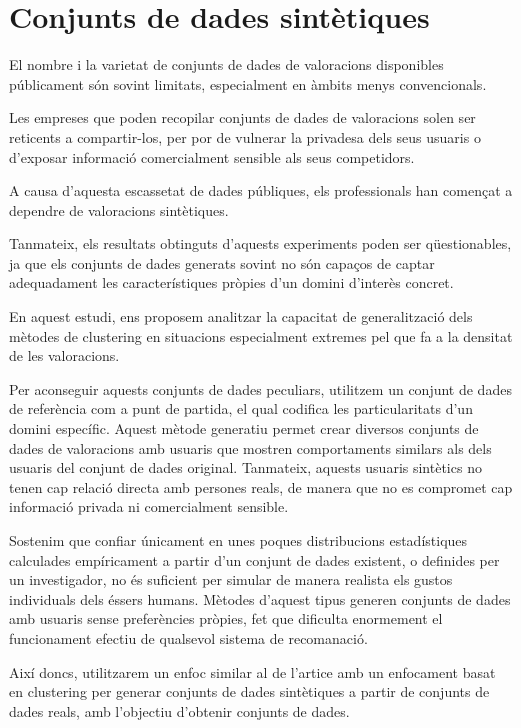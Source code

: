 \documentclass[a4paper,12pt]{report}
\begin{document}
\section{Conjunts de dades sintètiques}

El nombre i la varietat de conjunts de dades de valoracions disponibles públicament són sovint limitats, especialment en àmbits menys convencionals.

Les empreses que poden recopilar conjunts de dades de valoracions solen ser reticents a compartir-los, per por de vulnerar la privadesa dels seus usuaris o d’exposar informació comercialment sensible als seus competidors.

A causa d’aquesta escassetat de dades públiques, els professionals han començat a dependre de valoracions sintètiques.

Tanmateix, els resultats obtinguts d’aquests experiments poden ser qüestionables, ja que els conjunts de dades generats sovint no són capaços de captar adequadament les característiques pròpies d’un domini d’interès concret.

En aquest estudi, ens proposem analitzar la capacitat de generalització dels mètodes de clustering en situacions especialment extremes pel que fa a la densitat de les valoracions.

Per aconseguir aquests conjunts de dades peculiars, utilitzem un conjunt de dades de referència com a punt de partida, el qual codifica les particularitats d’un domini específic. Aquest mètode generatiu permet crear diversos conjunts de dades de valoracions amb usuaris que mostren comportaments similars als dels usuaris del conjunt de dades original. Tanmateix, aquests usuaris sintètics no tenen cap relació directa amb persones reals, de manera que no es compromet cap informació privada ni comercialment sensible.

Sostenim que confiar únicament en unes poques distribucions estadístiques calculades empíricament a partir d’un conjunt de dades existent, o definides per un investigador, no és suficient per simular de manera realista els gustos individuals dels éssers humans. Mètodes d’aquest tipus generen conjunts de dades amb usuaris sense preferències pròpies, fet que dificulta enormement el funcionament efectiu de qualsevol sistema de recomanació.

Així doncs, utilitzarem un enfoc similar al  de l'artice \cite{monti2019all} amb un enfocament basat en clustering per generar conjunts de dades sintètiques a partir de conjunts de dades reals, amb l’objectiu d’obtenir conjunts de dades.
\end{document}
